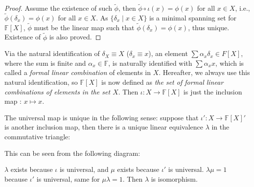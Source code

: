 \documentclass[
	11pt, %
	fleqn, %
	a4paper, %
]{LegrandOrangeBook}
\newcommand{\F}{\mathbb{F}} %
\begin{document}
\begin{proof}
    Assume the existence of such $\tilde{\phi}$, then $\tilde{\phi} \circ \iota (x) = \phi(x)$ for all $x \in X$, i.e., $\tilde{\phi} (\delta_x) = \phi(x)$ for all $x \in X$. As $\{ \delta_x \mid x \in X \}$ is a minimal spanning set for $\F[X]$, $\tilde{\phi}$ must be the linear map such that $\tilde{\phi} (\delta_x) = \phi(x)$, thus unique. Existence of $\tilde{\phi}$ is also proved.
\end{proof}

Via the natural identification of $\delta_X \equiv X$ ($\delta_x \equiv x$), an element $\sum \alpha_x \delta_x \in F[X]$, where the sum is finite and $\alpha_x \in \F$, is naturally identified with $\sum \alpha_x x$, which is called a \emph{formal linear combination} of elements in $X$. Hereafter, we always use this natural identification, so $\F[X]$ is now defined as \emph{the set of formal linear combinations of elements in the set $X$}. Then $\iota : X \to \F[X]$ is just the inclusion map : $x \mapsto x$.

The universal map is unique in the following sense: suppose that $\iota' : X \to \F[X]'$ is another inclusion map, then there is a unique linear equivalence $\lambda$ in the commutative triangle:
\begin{center}
\end{center}

This can be seen from the following diagram:
\begin{center}
\end{center}
$\lambda$ exists because $\iota$ is universal, and $\mu$ exists because $\iota'$ is universal. $\lambda \mu = 1$ because $\iota'$ is universal, same for $\mu \lambda = 1$. Then $\lambda$ is isomorphism.
\end{document}
